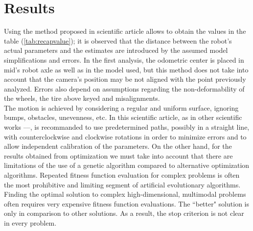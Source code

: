 \section{Results}
Using the method proposed in scientific article \cite{1512356} allows to obtain the values in the table (\ref{tab:recapvalue}); it is observed that the distance between the robot’s actual parameters and the estimates are introduced by the assumed model simplifications and errors.
In the first analysis, the odometric center is placed in mid’s robot axle as well as in the model used, but this method does not take into account that the camera’s position may be not aligned with the point previously analyzed.
Errors also depend on assumptions regarding the non-deformability of the wheels, the tire above keyed and misalignments.\\ 
The motion is achieved by considering a regular and uniform surface, ignoring bumps, obstacles, unevenness, etc. 
In this scientific article, as in other scientific works \cite{censi13joint}--\cite{Jung2016}--\cite{DBLP:journals/ijrr/ChongK99}, is recommanded to use predetermined paths, possibly in a straight line, with counterclockwise and clockwise rotations in order to minimize errors and to allow independent calibration of the parameters.
On the other hand, for the results obtained from optimization we must take into account that there are limitations of the use of a genetic algorithm compared to alternative optimization algorithms.
Repeated fitness function evaluation for complex problems is often the most prohibitive and limiting segment of artificial evolutionary algorithms. Finding the optimal solution to complex high-dimensional, multimodal problems often requires very expensive fitness function evaluations.
The ``better" solution is only in comparison to other solutions. As a result, the stop criterion is not clear in every problem.
